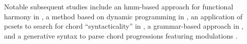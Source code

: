 

Notable subsequent studies include an \gls{hmm}-based
approach for functional harmony in
\textcite{raphael2004functional}, a method based on dynamic
programming in \textcite{illescas2007harmonic}, an
application of \gls{pcset}s to search for chord
``syntacticality'' in \textcite{rohrmeier2008statistical}, a
grammar-based approach in
\textcite{magalhaes2011functional}, and a generative syntax
to parse chord progressions featuring modulations
\textcite{rohrmeier2011towards}.


